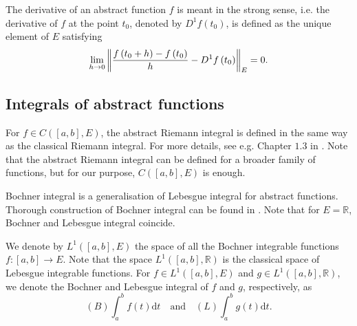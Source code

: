 \documentclass[reqno]{amsart}
\numberwithin{equation}{section}
\theoremstyle{definition}
\theoremstyle{remark}
\newcommand{\Bint}[3]{\br{B}\!\displaystyle\int_{#1}^{#2}{#3}}
\newcommand{\br}[1]{\left(#1\right)}
\newcommand{\C}[2]{C\br{#1,#2}}
\newcommand{\D}[1]{D^1#1}
\newcommand{\dt}{\mathrm{d}t}
\newcommand{\LOne}[2]{L^1\br{#1,#2}}
\newcommand{\Lint}[3]{\br{L}\!\displaystyle\int_{#1}^{#2}{#3}}
\newcommand{\R}{\mathbb{R}}
\newcommand{\sbr}[1]{\left[#1\right]}
\newcommand{\st}{\!:}
\begin{document}
	The derivative of an abstract function $f$ is meant in the strong sense, i.e. the derivative of $f$ at the point $t_0$, denoted by $\D{f}\br{t_0}$, is defined as the unique element of $E$ satisfying
	\begin{equation}\label{eq_02_01}
		\lim_{h\rightarrow0}\norm{\frac{f\br{t_0+h}-f\br{t_0}}{h}-\D{f}\br{t_0}}_E=0.
	\end{equation}
	
	\subsection{Integrals of abstract functions}
	For $f\in\C{\sbr{a,b}}{E}$, the abstract Riemann integral is defined in the same way as the classical Riemann integral. For more details, see e.g. Chapter $1.3$ in \cite{Ladas_Lakshmikantham}. Note that the abstract Riemann integral can be defined for a broader family of functions, but for our purpose, $\C{\sbr{a,b}}{E}$ is enough.
	
	Bochner integral is a generalisation of Lebesgue integral for abstract functions. Thorough construction of Bochner integral can be found in \cite{Mikusinski}. Note that for $E=\R$, Bochner and Lebesgue integral coincide.
	
	We denote by $\LOne{\sbr{a,b}}{E}$ the space of all the Bochner integrable functions $f\st\sbr{a,b}\rightarrow{E}$. Note that the space $\LOne{\sbr{a,b}}{\R}$ is the classical space of Lebesgue integrable functions. For $f\in\LOne{\sbr{a,b}}{E}$ and $g\in\LOne{\sbr{a,b}}{\R}$, we denote the Bochner and Lebesgue integral of $f$ and $g$, respectively, as
	\begin{equation*}
		\Bint{a}{b}{f\br{t}\dt}\quad\text{and}\quad\Lint{a}{b}{g\br{t}\dt}.
	\end{equation*}
	
\end{document}
